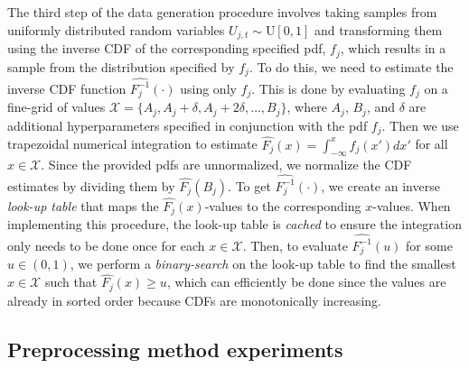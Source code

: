 \documentclass{statsmsc}
\begin{document}
{The third step of the data generation procedure involves taking samples from
uniformly distributed random variables $U_{j,t} \sim \textrm{U}[0,1]$ and transforming them
using the inverse \ac{CDF} of the corresponding specified \ac{pdf}, $f_j$, which results in
a sample from the distribution specified by $f_j$. To do this, we need to estimate the inverse
\ac{CDF} function $\widehat{F^{-1}_j}(\cdot)$ using only $f_j$. This is done by evaluating
$f_j$ on a fine-grid of values $\mathcal{X}=\{A_j,A_j+\delta,A_j+2\delta,\dots,B_j\}$, where
$A_j$, $B_j$, and $\delta$ are additional
hyperparameters specified in conjunction with the \ac{pdf} $f_j$.
Then we use trapezoidal numerical integration \citep{num_anal} to estimate
$\widehat{F_j}(x)=\int_{-\infty}^x f_j(x') dx'$  for all $x \in \mathcal{X}$. Since the provided
\acp{pdf} are unnormalized, we normalize the \ac{CDF} estimates by dividing them by
$\widehat{F_j}(B_j)$.
To get $\widehat{F_j^{-1}}(\cdot)$, we create an inverse \textit{look-up table} that maps the
$\widehat{F_j}(x)$-values to the corresponding $x$-values. When implementing this procedure,
the look-up table is \textit{cached} to ensure the integration only needs to be done
once for each $x \in \mathcal{X}$. Then, to evaluate $\widehat{F^{-1}_j}(u)$ for some $u \in (0,1)$,
we perform a \textit{binary-search} on the look-up table to find the smallest $x \in \mathcal{X}$ such that
$\widehat{F_j}(x) \geq u$, which can efficiently be done since the values are already in sorted order
because \acp{CDF} are monotonically increasing.



\subsection{Preprocessing method experiments}%
\label{sub:Preprocessing method experiments}

}
\end{document}
